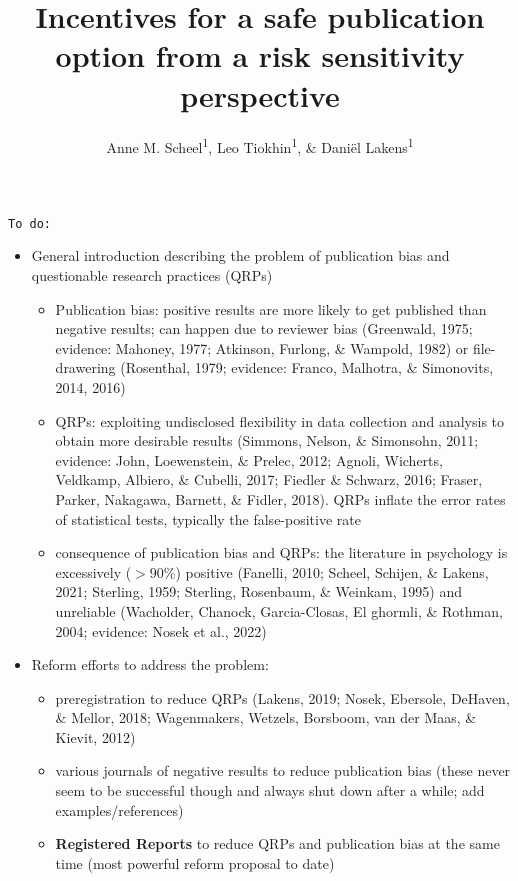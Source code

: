 \documentclass[british,,man,mask,floatsintext]{apa6}
\title{Incentives for a safe publication option from a risk sensitivity perspective}
\author{Anne M. Scheel\textsuperscript{1}, Leo Tiokhin\textsuperscript{1}, \& Daniël Lakens\textsuperscript{1}}
\date{}
\affiliation{\vspace{0.5cm}\textsuperscript{1} Eindhoven University of Technology}
\providecommand{\tightlist}{%
  \setlength{\itemsep}{0pt}\setlength{\parskip}{0pt}}
\begin{document}
\maketitle

\texttt{To\ do:}

\begin{itemize}
\tightlist
\item
  General introduction describing the problem of publication bias and questionable research practices (QRPs)

  \begin{itemize}
  \tightlist
  \item
    Publication bias: positive results are more likely to get published than negative results; can happen due to reviewer bias (Greenwald, 1975; evidence: Mahoney, 1977; Atkinson, Furlong, \& Wampold, 1982) or file-drawering (Rosenthal, 1979; evidence: Franco, Malhotra, \& Simonovits, 2014, 2016)
  \item
    QRPs: exploiting undisclosed flexibility in data collection and analysis to obtain more desirable results (Simmons, Nelson, \& Simonsohn, 2011; evidence: John, Loewenstein, \& Prelec, 2012; Agnoli, Wicherts, Veldkamp, Albiero, \& Cubelli, 2017; Fiedler \& Schwarz, 2016; Fraser, Parker, Nakagawa, Barnett, \& Fidler, 2018). QRPs inflate the error rates of statistical tests, typically the false-positive rate
  \item
    consequence of publication bias and QRPs: the literature in psychology is excessively (\(>90\%\)) positive (Fanelli, 2010; Scheel, Schijen, \& Lakens, 2021; Sterling, 1959; Sterling, Rosenbaum, \& Weinkam, 1995) and unreliable (Wacholder, Chanock, Garcia-Closas, El ghormli, \& Rothman, 2004; evidence: Nosek et al., 2022)
  \end{itemize}
\item
  Reform efforts to address the problem:

  \begin{itemize}
  \tightlist
  \item
    preregistration to reduce QRPs (Lakens, 2019; Nosek, Ebersole, DeHaven, \& Mellor, 2018; Wagenmakers, Wetzels, Borsboom, van der Maas, \& Kievit, 2012)
  \item
    various journals of negative results to reduce publication bias (these never seem to be successful though and always shut down after a while; add examples/references)
  \item
    \textbf{Registered Reports} to reduce QRPs and publication bias at the same time (most powerful reform proposal to date)
  \end{itemize}
\end{itemize}
\end{document}
